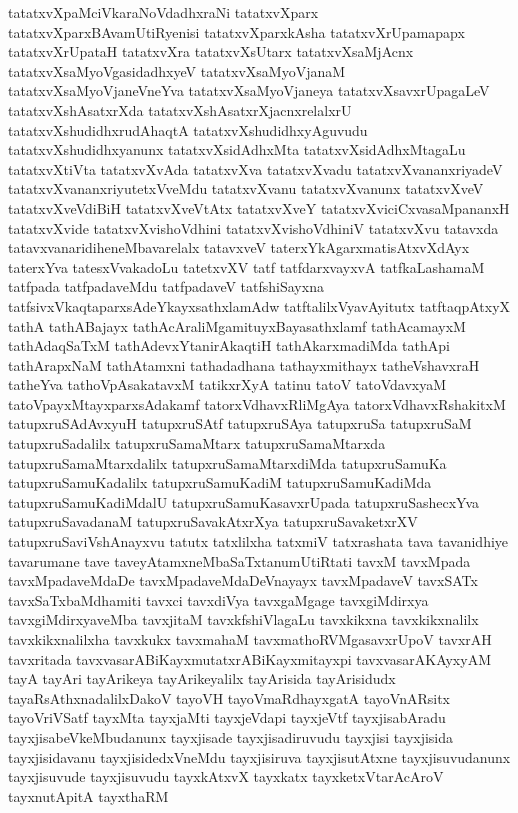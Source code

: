 {tatatxvXpaMciVkaraNoVdadhxraNi
tatatxvXparx
tatatxvXparxBAvamUtiRyenisi
tatatxvXparxkAsha
tatatxvXrUpamapapx
tatatxvXrUpataH
tatatxvXra
tatatxvXsUtarx
tatatxvXsaMjAcnx
tatatxvXsaMyoVgasidadhxyeV
tatatxvXsaMyoVjanaM
tatatxvXsaMyoVjaneVneYva
tatatxvXsaMyoVjaneya
tatatxvXsavxrUpagaLeV
tatatxvXshAsatxrXda
tatatxvXshAsatxrXjacnxrelalxrU
tatatxvXshudidhxrudAhaqtA
tatatxvXshudidhxyAguvudu
tatatxvXshudidhxyanunx
tatatxvXsidAdhxMta
tatatxvXsidAdhxMtagaLu
tatatxvXtiVta
tatatxvXvAda
tatatxvXva
tatatxvXvadu
tatatxvXvananxriyadeV
tatatxvXvananxriyutetxVveMdu
tatatxvXvanu
tatatxvXvanunx
tatatxvXveV
tatatxvXveVdiBiH
tatatxvXveVtAtx
tatatxvXveY
tatatxvXviciCxvasaMpananxH
tatatxvXvide
tatatxvXvishoVdhini
tatatxvXvishoVdhiniV
tatatxvXvu
tatavxda
tatavxvanaridiheneMbavarelalx
tatavxveV
taterxYkAgarxmatisAtxvXdAyx
taterxYva
tatesxVvakadoLu
tatetxvXV
tatf
tatfdarxvayxvA
tatfkaLashamaM
tatfpada
tatfpadaveMdu
tatfpadaveV
tatfshiSayxna
tatfsivxVkaqtaparxsAdeYkayxsathxlamAdw
tatftalilxVyavAyitutx
tatftaqpAtxyX
tathA
tathABajayx
tathAcAraliMgamituyxBayasathxlamf
tathAcamayxM
tathAdaqSaTxM
tathAdevxYtanirAkaqtiH
tathAkarxmadiMda
tathApi
tathArapxNaM
tathAtamxni
tathadadhana
tathayxmithayx
tatheVshavxraH
tatheYva
tathoVpAsakatavxM
tatikxrXyA
tatinu
tatoV
tatoVdavxyaM
tatoVpayxMtayxparxsAdakamf
tatorxVdhavxRliMgAya
tatorxVdhavxRshakitxM
tatupxruSAdAvxyuH
tatupxruSAtf
tatupxruSAya
tatupxruSa
tatupxruSaM
tatupxruSadalilx
tatupxruSamaMtarx
tatupxruSamaMtarxda
tatupxruSamaMtarxdalilx
tatupxruSamaMtarxdiMda
tatupxruSamuKa
tatupxruSamuKadalilx
tatupxruSamuKadiM
tatupxruSamuKadiMda
tatupxruSamuKadiMdalU
tatupxruSamuKasavxrUpada
tatupxruSashecxYva
tatupxruSavadanaM
tatupxruSavakAtxrXya
tatupxruSavaketxrXV
tatupxruSaviVshAnayxvu
tatutx
tatxlilxha
tatxmiV
tatxrashata
tava
tavanidhiye
tavarumane
tave
taveyAtamxneMbaSaTxtanumUtiRtati
tavxM
tavxMpada
tavxMpadaveMdaDe
tavxMpadaveMdaDeVnayayx
tavxMpadaveV
tavxSATx
tavxSaTxbaMdhamiti
tavxci
tavxdiVya
tavxgaMgage
tavxgiMdirxya
tavxgiMdirxyaveMba
tavxjitaM
tavxkfshiVlagaLu
tavxkikxna
tavxkikxnalilx
tavxkikxnalilxha
tavxkukx
tavxmahaM
tavxmathoRVMgasavxrUpoV
tavxrAH
tavxritada
tavxvasarABiKayxmutatxrABiKayxmitayxpi
tavxvasarAKAyxyAM
tayA
tayAri
tayArikeya
tayArikeyalilx
tayArisida
tayArisidudx
tayaRsAthxnadalilxDakoV
tayoVH
tayoVmaRdhayxgatA
tayoVnARsitx
tayoVriVSatf
tayxMta
tayxjaMti
tayxjeVdapi
tayxjeVtf
tayxjisabAradu
tayxjisabeVkeMbudanunx
tayxjisade
tayxjisadiruvudu
tayxjisi
tayxjisida
tayxjisidavanu
tayxjisidedxVneMdu
tayxjisiruva
tayxjisutAtxne
tayxjisuvudanunx
tayxjisuvude
tayxjisuvudu
tayxkAtxvX
tayxkatx
tayxketxVtarAcAroV
tayxnutApitA
tayxthaRM
}
